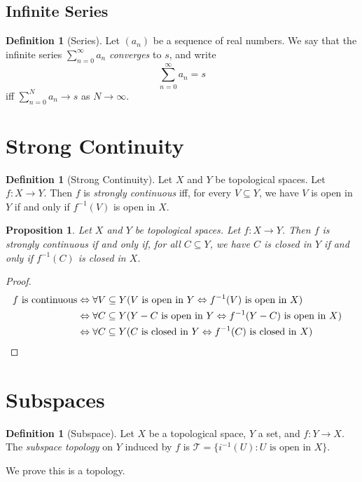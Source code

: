 \documentclass{book}
\let\qed\relax
\newtheorem{prop}[ax]{Proposition}
\theoremstyle{definition}
\newtheorem{df}[ax]{Definition}
\newcommand{\inv}[1]{\ensuremath{{#1}^{-1}}}
\begin{document}
\subsection{Infinite Series}

\begin{df}[Series]
Let $(a_n)$ be a sequence of real numbers. We say that the infinite series $\sum_{n=0}^\infty a_n$ \emph{converges} to $s$, and write
\[ \sum_{n=0}^\infty a_n = s \]
iff $\sum_{n=0}^N a_n \rightarrow s$ as $N \rightarrow \infty$.
\end{df}

\section{Strong Continuity}

\begin{df}[Strong Continuity]
Let $X$ and $Y$ be topological spaces. Let $f : X \rightarrow Y$. Then $f$ is \emph{strongly continuous} iff, for every $V \subseteq Y$, we have $V$ is open in $Y$ if and only if $\inv{f}(V)$ is open in $X$.
\end{df}

\begin{prop}
Let $X$ and $Y$ be topological spaces. Let $f : X \rightarrow Y$. Then $f$ is strongly continuous if and only if, for all $C \subseteq Y$, we have $C$ is closed in $Y$ if and only if $\inv{f}(C)$ is closed in $X$.
\end{prop}

\begin{proof}
\pf
\begin{align*}
f \text{ is continuous} & \Leftrightarrow \forall V \subseteq Y ( V \text{ is open in } Y \Leftrightarrow \inv{f}(V) \text{ is open in } X) \\
& \Leftrightarrow \forall C \subseteq Y (Y - C \text{ is open in } Y \Leftrightarrow \inv{f}(Y - C) \text{ is open in } X) \\
& \Leftrightarrow \forall C \subseteq Y (C \text{ is closed in } Y \Leftrightarrow \inv{f}(C) \text{ is closed in } X) & \qed
\end{align*}
\end{proof}

\section{Subspaces}

\begin{df}[Subspace]
Let $X$ be a topological space, $Y$ a set, and $f : Y \rightarrow X$. The \emph{subspace topology} on $Y$ induced by $f$ is $\mathcal{T} = \{ \inv{i}(U) : U \text{ is open in } X \}$.

We prove this is a topology.
\end{df}
\end{document}
